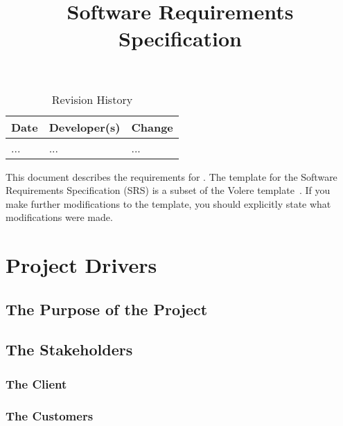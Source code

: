 \documentclass[12pt]{article}
\title{Software Requirements Specification\\\progname}
\author{\authname}
\date{}
\begin{document}
\maketitle

\newpage
{}

\tableofcontents

\newpage

\begin{table}[hp]
\caption{Revision History} \label{TblRevisionHistory}
\begin{tabularx}{\textwidth}{llX}
\toprule
\textbf{Date} & \textbf{Developer(s)} & \textbf{Change}\\
\midrule
... & ... & ...\\
\bottomrule
\end{tabularx}
\end{table}

\newpage

\listoftables
\listoffigures

\newpage


This document describes the requirements for \progname. The template for the Software
Requirements Specification (SRS) is a subset of the Volere
template~\cite{RobertsonAndRobertson2012}. If you make further modifications
to the template, you should explicitly state what modifications were made.

\begin{table}

\end{table}

\section{Project Drivers}

\subsection{The Purpose of the Project}

\subsection{The Stakeholders}

\subsubsection{The Client}

\subsubsection{The Customers}
\end{document}
